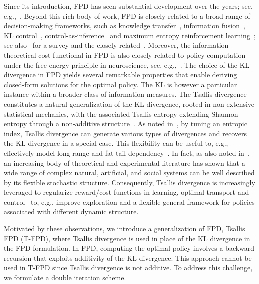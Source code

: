 \documentclass[a4paper,fleqn]{cas-sc}
\begin{document}
Since its introduction, FPD has seen substantial development over the years; see, e.g.,~\cite{MK-TG:06,karny2012axiomatisation,RH-15,AQ-MK-TG:16,MK:20,gagliardi2022probabilistic,MK-TS:23,MK-SM:25}. Beyond this rich body of work, FPD is closely related to a broad range of decision-making frameworks, such as knowledge transfer~\cite{foley2017fully}, information fusion~\cite{azizi2016hierarchical}, KL control~\cite{ET:09,PG_MR_RW:14}, control-as-inference~\cite{HK-VC-MO:12,MahmoudiFilabadi2026} and maximum entropy reinforcement learning~\cite{eysenbach2022maximum}; see also~\cite{EG-GR:22} for a survey and the closely related~\cite{bhole2025unifyingentropyregularizationoptimal}. Moreover, the information theoretical cost functional in FPD is also closely related to policy computation under the free energy principle in neuroscience, see, e.g.,~\cite{KF:09,AS-HJ-KF-GR:25}. The choice of the KL divergence in FPD yields several remarkable properties that enable deriving closed-form solutions for the optimal policy. The KL is however a particular instance within a broader class of information measures. The Tsallis divergence constitutes a natural generalization of the KL divergence, rooted in non-extensive statistical mechanics, with the associated Tsallis entropy extending Shannon entropy through a non-additive structure~\cite{CT:88,CT-GMM-YS:05}. As noted in~\cite{lee2019tsallis}, by tuning an entropic index, Tsallis divergence can generate various types of divergences and recovers the KL divergence in a special case. This flexibility can be useful to, e.g., effectively model long range and fat tail dependency~\cite{lee2019tsallis}.  In fact, as also noted in~\cite{wang2021variational}, an increasing body of theoretical and experimental literature has shown that a wide range of complex natural, artificial, and social systems can be well described by its flexible stochastic structure. Consequently, Tsallis divergence is increasingly leveraged to regularize reward/cost functions in learning, optimal transport and control~\cite{lee2019tsallis,LZ-ZC-MS-MW:23,nielsen2011r,wang2021variational,10.5555/3298483.3298583} to, e.g., improve exploration and a flexible general framework for policies associated with different dynamic structure.

Motivated by these observations, we introduce a generalization of FPD, Tsallis FPD (T-FPD), where Tsallis divergence is used in place of the KL divergence in the FPD formulation. In FPD, computing the optimal policy involves a backward recursion that exploits additivity of the KL divergence. This approach cannot be used in T-FPD since Tsallis divergence is not additive. To address this challenge, we  formulate a double iteration scheme. 
\end{document}
